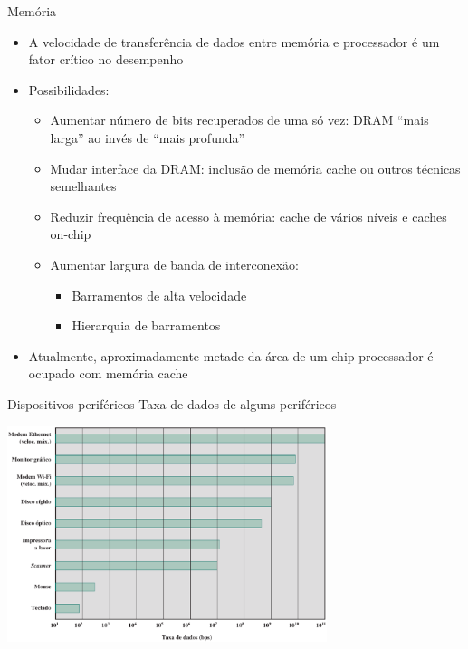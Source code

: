 \begin{slide}[toc=]{Memória}
	\begin{itemize}
		\item A velocidade de transferência de dados entre memória e processador é um fator crítico no desempenho\pause
		\item Possibilidades:
			\begin{itemize}
				\item Aumentar número de bits recuperados de uma só vez: DRAM ``mais larga'' ao invés de ``mais profunda''\pause
				\item Mudar interface da DRAM: inclusão de memória cache ou outros técnicas semelhantes \pause
				\item Reduzir frequência de acesso à memória: cache de vários níveis e caches on-chip\pause
				\item Aumentar largura de banda de interconexão:
					\begin{itemize}
						\item Barramentos de alta velocidade
						\item Hierarquia de barramentos\pause
					\end{itemize}
			\end{itemize}
		\item Atualmente, aproximadamente metade da área de um chip processador é ocupado com memória cache
	\end{itemize}
\end{slide}

\begin{slide}[toc=]{Dispositivos periféricos}
	Taxa de dados de alguns periféricos
	\begin{center}
		\includegraphics[width=0.7\textwidth]{figs/taxa-dados}
	\end{center}
\end{slide}

